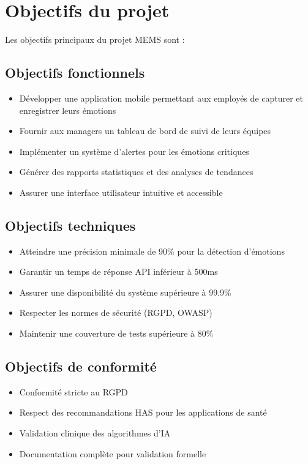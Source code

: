 \documentclass[a4paper,11pt]{report}
\begin{document}
\section{Objectifs du projet}

Les objectifs principaux du projet MEMS sont :

\subsection{Objectifs fonctionnels}

\begin{itemize}
    \item Développer une application mobile permettant aux employés de capturer et enregistrer leurs émotions
    \item Fournir aux managers un tableau de bord de suivi de leurs équipes
    \item Implémenter un système d'alertes pour les émotions critiques
    \item Générer des rapports statistiques et des analyses de tendances
    \item Assurer une interface utilisateur intuitive et accessible
\end{itemize}

\subsection{Objectifs techniques}

\begin{itemize}
    \item Atteindre une précision minimale de 90\% pour la détection d'émotions
    \item Garantir un temps de réponse API inférieur à 500ms
    \item Assurer une disponibilité du système supérieure à 99.9\%
    \item Respecter les normes de sécurité (RGPD, OWASP)
    \item Maintenir une couverture de tests supérieure à 80\%
\end{itemize}

\subsection{Objectifs de conformité}

\begin{itemize}
    \item Conformité stricte au RGPD
    \item Respect des recommandations HAS pour les applications de santé
    \item Validation clinique des algorithmes d'IA
    \item Documentation complète pour validation formelle
\end{itemize}
\end{document}
